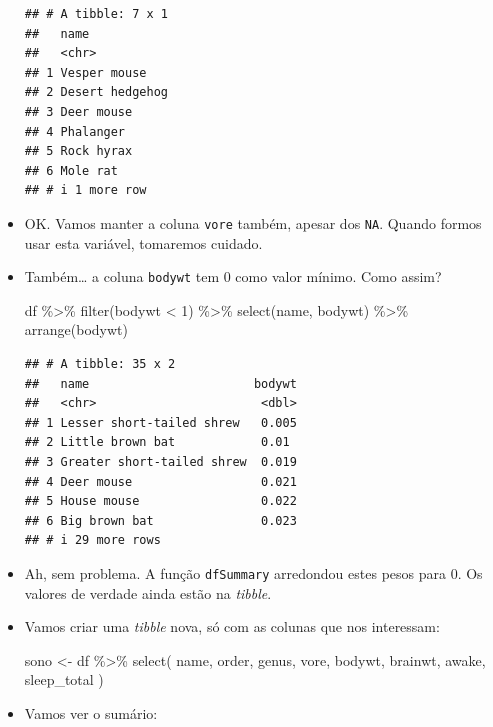 \documentclass[
  11pt]{report}
\newenvironment{Shaded}{\begin{snugshade}}{\end{snugshade}}
\newcommand{\DecValTok}[1]{\textcolor[rgb]{0.00,0.00,0.81}{#1}}
\newcommand{\FunctionTok}[1]{\textcolor[rgb]{0.00,0.00,0.00}{#1}}
\newcommand{\NormalTok}[1]{#1}
\newcommand{\OtherTok}[1]{\textcolor[rgb]{0.56,0.35,0.01}{#1}}
\newcommand{\SpecialCharTok}[1]{\textcolor[rgb]{0.00,0.00,0.00}{#1}}
\renewenvironment{Shaded}{
    \begin{mdframed}[%
      roundcorner=2pt,%
      innerleftmargin=5pt,%
      innerrightmargin=5pt,%
      topline=true,%
      leftline=true,%
      rightline=true,%
      bottomline=true,%
      linewidth=0.5pt,%
      linecolor=black!20,%
      backgroundcolor=black!2,%
      skipabove=2ex,%
      skipbelow=2.5ex%
    ]%
  }
  {
    \end{mdframed}
  }
\begin{document}
\begin{itemize}
\begin{verbatim}
## # A tibble: 7 x 1
##   name           
##   <chr>          
## 1 Vesper mouse   
## 2 Desert hedgehog
## 3 Deer mouse     
## 4 Phalanger      
## 5 Rock hyrax     
## 6 Mole rat       
## # i 1 more row
\end{verbatim}
\item
  OK. Vamos manter a coluna \texttt{vore} também, apesar dos \texttt{NA}. Quando formos usar esta variável, tomaremos cuidado.
\item
  Também\ldots{} a coluna \texttt{bodywt} tem 0 como valor mínimo. Como assim?

\begin{Shaded}
\begin{Highlighting}[]
\NormalTok{df }\SpecialCharTok{\%\textgreater{}\%} 
  \FunctionTok{filter}\NormalTok{(bodywt }\SpecialCharTok{\textless{}} \DecValTok{1}\NormalTok{) }\SpecialCharTok{\%\textgreater{}\%} 
  \FunctionTok{select}\NormalTok{(name, bodywt) }\SpecialCharTok{\%\textgreater{}\%} 
  \FunctionTok{arrange}\NormalTok{(bodywt)}
\end{Highlighting}
\end{Shaded}

\begin{verbatim}
## # A tibble: 35 x 2
##   name                       bodywt
##   <chr>                       <dbl>
## 1 Lesser short-tailed shrew   0.005
## 2 Little brown bat            0.01 
## 3 Greater short-tailed shrew  0.019
## 4 Deer mouse                  0.021
## 5 House mouse                 0.022
## 6 Big brown bat               0.023
## # i 29 more rows
\end{verbatim}
\item
  Ah, sem problema. A função \texttt{dfSummary} arredondou estes pesos para 0. Os valores de verdade ainda estão na \emph{tibble}.
\item
  Vamos criar uma \emph{tibble} nova, só com as colunas que nos interessam:

\begin{Shaded}
\begin{Highlighting}[]
\NormalTok{sono }\OtherTok{\textless{}{-}}\NormalTok{ df }\SpecialCharTok{\%\textgreater{}\%} 
  \FunctionTok{select}\NormalTok{(}
\NormalTok{    name, order, genus, vore, bodywt, }
\NormalTok{    brainwt, awake, sleep\_total}
\NormalTok{  )}
\end{Highlighting}
\end{Shaded}
\item
  Vamos ver o sumário:


\end{itemize}
\end{document}
